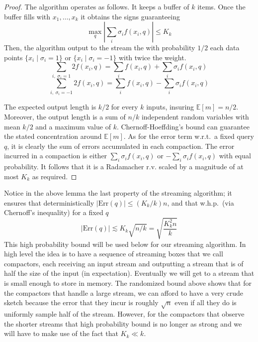 \documentclass[anon,12pt]{colt2019} %
\newcommand{\el}[1]{\textcolor{blue}{EL: #1}}
\newcommand{\E}{\mathbb{E}}
\begin{document}
\begin{proof}
The algorithm operates as follows. It keeps a buffer of $k$ items. Once the buffer fills with $x_1,\ldots,x_k$ it obtains the signs guaranteeing
$$\max_q \left| \sum_i \sigma_i f(x_i, q)\right| \leq K_k$$
Then, the algorithm output to the stream the with probability $1/2$ each data points $\{x_i \; | \; \sigma_i = 1\}$ or $\{x_i \; | \; \sigma_i = -1\}$ with twice the weight.
$$\sum_{i ,\; \sigma_i=1} 2f(x_i, q) = \sum_{i} f(x_i, q) +  \sum_{i} \sigma_i f(x_i, q)$$
$$\sum_{i ,\; \sigma_i=-1} 2f(x_i, q) = \sum_{i} f(x_i, q) - \sum_{i} \sigma_i f(x_i, q)$$

The expected output length is $k/2$ for every $k$ inputs, insuring $\E[m]=n/2$. Moreover, the output length is a sum of $n/k$ independent random variables with mean $k/2$ and a maximum value of $k$. Chernoff-Hoeffding's bound can guarantee the stated concentration around $\E[m]$.
As for the error term w.r.t.\ a fixed query $q$, it is clearly the sum of errors accumulated in each compaction. The error incurred in a compaction is either 
$\sum_i \sigma_i f(x_i, q)$ or $-\sum_i \sigma_i f(x_i, q)$ with equal probability. It follows that it is a Radamacher r.v. scaled by a magnitude of at most $K_k$ as required.
\end{proof}

Notice in the above lemma the last property of the streaming algorithm; it ensures that deterministically $|\text{Err}(q)| \leq (K_k/k) n$, and that w.h.p.\ (via Chernoff's inequality) for a fixed $q$ 
$$|\text{Err}(q)| \lesssim K_k \sqrt{n/k} = \sqrt{\frac{K_k^2 n}{k}}$$
This high probability bound will be used below for our streaming algorithm. In high level the idea is to have a sequence of streaming boxes that we call compactors, each receiving an input stream and outputting a stream that is of half the size of the input (in expectation). Eventually we will get to a stream that is small enough to store in memory. The randomized bound above shows that for the compactors that handle a large stream, we can afford to have a very crude sketch because the error that they incur is roughly $\sqrt{n}$ even if all they do is uniformly sample half of the stream. However, for the compactors that observe the shorter streams that high probability bound is no longer as strong and we will have to make use of the fact that $K_k \ll k$.
\end{document}
